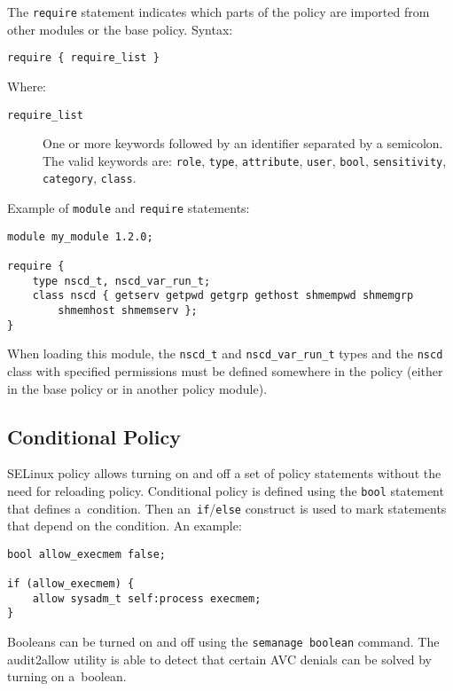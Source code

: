 The \texttt{require} statement indicates which parts of the policy are imported
from other modules or the base policy. Syntax:
\begin{lstlisting}[language=te]
require { require_list }
\end{lstlisting}
Where:
\begin{description}
    \item [\texttt{require\_list}] One or more keywords followed by an
        identifier separated by a semicolon. The valid keywords are:
        \texttt{role}, \texttt{type}, \texttt{attribute}, \texttt{user},
        \texttt{bool}, \texttt{sensitivity}, \texttt{category}, \texttt{class}.
\end{description}

Example of \texttt{module} and \texttt{require} statements:
\begin{lstlisting}[language=te]
module my_module 1.2.0;

require {
    type nscd_t, nscd_var_run_t;
    class nscd { getserv getpwd getgrp gethost shmempwd shmemgrp
        shmemhost shmemserv };
}
\end{lstlisting}
When loading this module, the \texttt{nscd\_t} and \texttt{nscd\_var\_run\_t}
types and the \texttt{nscd} class with specified permissions must be defined
somewhere in the policy (either in the base policy or in another policy module).

\subsection{Conditional Policy}
\label{booleans}
SELinux policy allows turning on and off a set of policy statements without the
need for reloading policy. Conditional policy is defined using the \texttt{bool}
statement that defines a~condition. Then an~\texttt{if}/\texttt{else} construct
is used to mark statements that depend on the condition. An example:
\begin{lstlisting}[language=te]
bool allow_execmem false;

if (allow_execmem) {
    allow sysadm_t self:process execmem;
}
\end{lstlisting}
Booleans can be turned on and off using the \texttt{semanage boolean} command.
The audit2allow utility is able to detect that certain AVC denials can be solved
by turning on a~boolean.

